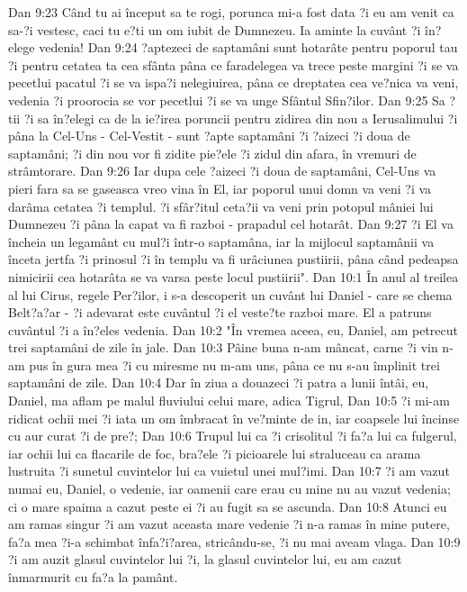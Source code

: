 Dan 9:23  Când tu ai început sa te rogi, porunca mi-a fost data ?i eu am venit ca sa-?i vestesc, caci tu e?ti un om iubit de Dumnezeu. Ia aminte la cuvânt ?i în?elege vedenia!
Dan 9:24  ?aptezeci de saptamâni sunt hotarâte pentru poporul tau ?i pentru cetatea ta cea sfânta pâna ce faradelegea va trece peste margini ?i se va pecetlui pacatul ?i se va ispa?i nelegiuirea, pâna ce dreptatea cea ve?nica va veni, vedenia ?i proorocia se vor pecetlui ?i se va unge Sfântul Sfin?ilor.
Dan 9:25  Sa ?tii ?i sa în?elegi ca de la ie?irea poruncii pentru zidirea din nou a Ierusalimului ?i pâna la Cel-Uns - Cel-Vestit - sunt ?apte saptamâni ?i ?aizeci ?i doua de saptamâni; ?i din nou vor fi zidite pie?ele ?i zidul din afara, în vremuri de strâmtorare.
Dan 9:26  Iar dupa cele ?aizeci ?i doua de saptamâni, Cel-Uns va pieri fara sa se gaseasca vreo vina în El, iar poporul unui domn va veni ?i va darâma cetatea ?i templul. ?i sfâr?itul ceta?ii va veni prin potopul mâniei lui Dumnezeu ?i pâna la capat va fi razboi - prapadul cel hotarât.
Dan 9:27  ?i El va încheia un legamânt cu mul?i într-o saptamâna, iar la mijlocul saptamânii va înceta jertfa ?i prinosul ?i în templu va fi urâciunea pustiirii, pâna când pedeapsa nimicirii cea hotarâta se va varsa peste locul pustiirii".
Dan 10:1  În anul al treilea al lui Cirus, regele Per?ilor, i s-a descoperit un cuvânt lui Daniel - care se chema Belt?a?ar - ?i adevarat este cuvântul ?i el veste?te razboi mare. El a patruns cuvântul ?i a în?eles vedenia.
Dan 10:2  "În vremea aceea, eu, Daniel, am petrecut trei saptamâni de zile în jale.
Dan 10:3  Pâine buna n-am mâncat, carne ?i vin n-am pus în gura mea ?i cu miresme nu m-am uns, pâna ce nu s-au împlinit trei saptamâni de zile.
Dan 10:4  Dar în ziua a douazeci ?i patra a lunii întâi, eu, Daniel, ma aflam pe malul fluviului celui mare, adica Tigrul,
Dan 10:5  ?i mi-am ridicat ochii mei ?i iata un om îmbracat în ve?minte de in, iar coapsele lui încinse cu aur curat ?i de pre?;
Dan 10:6  Trupul lui ca ?i crisolitul ?i fa?a lui ca fulgerul, iar ochii lui ca flacarile de foc, bra?ele ?i picioarele lui straluceau ca arama lustruita ?i sunetul cuvintelor lui ca vuietul unei mul?imi.
Dan 10:7  ?i am vazut numai eu, Daniel, o vedenie, iar oamenii care erau cu mine nu au vazut vedenia; ci o mare spaima a cazut peste ei ?i au fugit sa se ascunda.
Dan 10:8  Atunci eu am ramas singur ?i am vazut aceasta mare vedenie ?i n-a ramas în mine putere, fa?a mea ?i-a schimbat înfa?i?area, stricându-se, ?i nu mai aveam vlaga.
Dan 10:9  ?i am auzit glasul cuvintelor lui ?i, la glasul cuvintelor lui, eu am cazut înmarmurit cu fa?a la pamânt.
